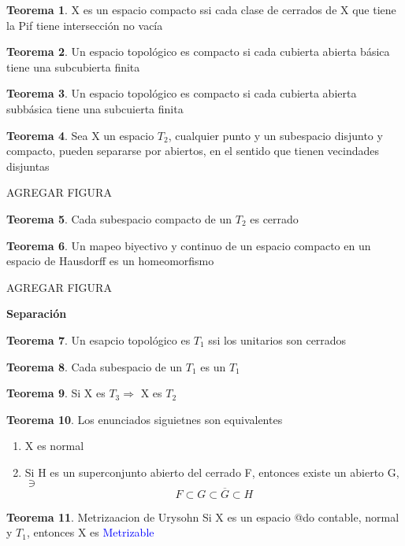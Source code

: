 \documentclass{article}
\theoremstyle{definition}
\newtheorem{theorem}{Teorema}[section]
\begin{document}
\begin{theorem}
	X es un espacio compacto ssi cada clase de cerrados de X que tiene la Pif tiene intersección no vacía
\end{theorem}
\begin{theorem}
	Un espacio topológico es compacto si cada cubierta abierta básica tiene una subcubierta finita
\end{theorem}
\begin{theorem}
	Un espacio topológico es compacto si cada cubierta abierta subbásica tiene una subcuierta finita
\end{theorem}
\begin{theorem}
	Sea X un espacio $T_2$, cualquier punto y un subespacio disjunto y compacto, pueden separarse por abiertos, en el sentido que tienen vecindades disjuntas
	
	AGREGAR FIGURA
\end{theorem}
\begin{theorem}
	Cada subespacio compacto de un $T_2$ es cerrado
\end{theorem}
\begin{theorem}
	Un mapeo biyectivo y continuo de un espacio compacto en un espacio de Hausdorff es un homeomorfismo
	
	AGREGAR FIGURA
\end{theorem}
\textbf{Separación}
\begin{theorem}
	Un esapcio topológico es $T_1$ ssi los unitarios son cerrados
\end{theorem}
\begin{theorem}
	Cada subespacio de un $T_1$ es un $T_1$
\end{theorem}
\begin{theorem}
	Si X es $T_3\Rightarrow$ X es $T_2$
\end{theorem}
\begin{theorem}
	Los enunciados siguietnes son equivalentes
	\begin{enumerate}
		\item X es normal
		\item Si H es un superconjunto abierto del cerrado F, entonces existe un abierto G, $\ni$
		\[F\subset G\subset \overline{G}\subset H\]
	\end{enumerate}
\end{theorem}
\begin{theorem}{Metrizaacion de Urysohn}
	Si X es un espacio @do contable, normal y $T_1$, entonces X es \textcolor{blue}{Metrizable}
\end{theorem}
\end{document}
